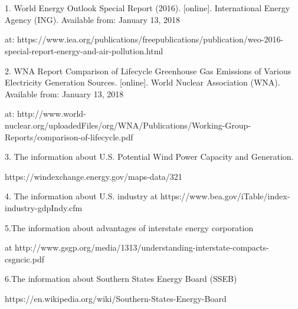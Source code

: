 \documentclass[12pt]{article}
\begin{document}
\section{}

1. World Energy Outlook Special Report (2016). [online]. International Energy Agency (ING). Available from: January 13, 2018

at: https://www.iea.org/publications/freepublications/publication/weo-2016-special-report-energy-and-air-pollution.html


2. WNA Report Comparison of Lifecycle Greenhouse Gas Emissions of Various Electricity Generation Sources. [online]. World Nuclear Association (WNA). Available from: January 13, 2018

at: http://www.world-nuclear.org/uploadedFiles/org/WNA/Publications/Working-Group-Reports/comparison-of-lifecycle.pdf


3. The information about U.S. Potential Wind Power Capacity and Generation.

https://windexchange.energy.gov/maps-data/321


4. The information about U.S. industry at https://www.bea.gov/iTable/index-industry-gdpIndy.cfm


5.The information about advantages of interstate energy corporation

at  http://www.gsgp.org/media/1313/understanding-interstate-compacts-csgncic.pdf

6.The information about Southern States Energy Board (SSEB)

https://en.wikipedia.org/wiki/Southern-States-Energy-Board
\end{document}
